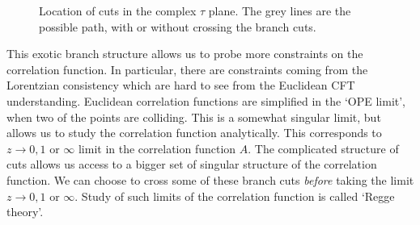 \begin{figure}[t]
  \centering
  \caption{Location of cuts in the complex $\tau$ plane.
    The grey lines are the possible path, with or without crossing the branch cuts.}
  \label{fig:cutsInTau}
\end{figure}

This exotic branch structure allows us to probe more constraints on the correlation function.
In particular, there are constraints coming from the Lorentzian consistency which are hard to see from the Euclidean CFT understanding.
Euclidean correlation functions are simplified in the `OPE limit', when two of the points are colliding.
This is a somewhat singular limit, but allows us to study the correlation function analytically.
This corresponds to $ z \rightarrow 0,1 \text{ or }  \infty $ limit in the correlation function $ A $.
The complicated structure of cuts allows us access to a bigger set of singular structure of the correlation function.
We can choose to cross some of these branch cuts \emph{before} taking the limit $ z \rightarrow 0,1 \text{ or }  \infty $.
Study of such limits of the correlation function is called `Regge theory'.

